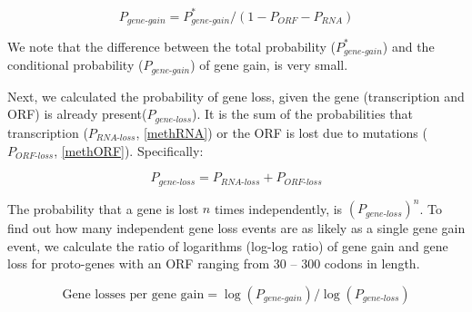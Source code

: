 \documentclass[12pt,a4paper]{article}
\begin{document}
\begin{equation}
P_\textit{gene-gain} = P_\textit{gene-gain}^*/(1-P_\textit{ORF} - P_\textit{RNA})
\label{genegaineq2}
\end{equation}

We note that the difference between the total probability ($P_\textit{gene-gain}^*$) and the conditional probability ($P_\textit{gene-gain}$) of gene gain, is very small.

Next, we calculated the probability of gene loss, given the gene (transcription and ORF) is already present($P_\textit{gene-loss}$). It is the sum of the probabilities that transcription ($P_\textit{RNA-loss}$, \autoref{methRNA}) or the ORF is lost due to mutations ($P_\textit{ORF-loss}$, \autoref{methORF}). Specifically:

\begin{equation}
P_\textit{gene-loss} = P_\textit{RNA-loss} + P_\textit{ORF-loss}
\label{genelosseq}
\end{equation}

The probability that a gene is lost $n$ times independently, is $(P_\textit{gene-loss})^{n}$. To find out how many independent gene loss events are as likely as a single gene gain event, we calculate the ratio of logarithms (log-log ratio) of gene gain and gene loss for proto-genes with an ORF ranging from 30 -- 300 codons in length.

\begin{equation}
\text{Gene losses per gene gain} = \log(P_\textit{gene-gain})/\log(P_\textit{gene-loss})
\label{loglogratio}
\end{equation}
\end{document}
